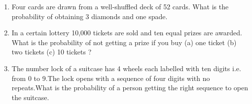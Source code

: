\begin{enumerate}[label=\thechapter.\arabic*,ref=\thechapter.\theenumi]
\item Four cards are drawn from a well-shuffled deck of 52 cards. What is the probability of obtaining 3 diamonds and one spade.
\\
\solution
		
\item In a certain lottery 10,000 tickets are sold and ten equal prizes are awarded. What is the probability of not getting a prize if you buy (a) one ticket (b) two tickets (c) 10 tickets ?	
\\
\solution
		
	\item 
The number lock of a suitcase has 4 wheels each labelled with ten digits i.e. from 0 to 9.The lock opens with a sequence of four digits with no repeats.What is the probability of a person getting the right sequence to open the suitcase.
\\
\solution
		
\end{enumerate}
